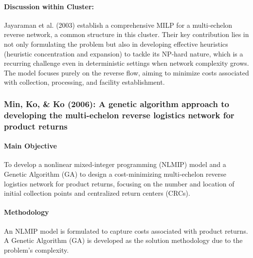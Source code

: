 \paragraph{Discussion within Cluster:} Jayaraman et al. (2003) establish a comprehensive MILP for a multi-echelon reverse network, a common structure in this cluster. Their key contribution lies in not only formulating the problem but also in developing effective heuristics (heuristic concentration and expansion) to tackle its NP-hard nature, which is a recurring challenge even in deterministic settings when network complexity grows. The model focuses purely on the reverse flow, aiming to minimize costs associated with collection, processing, and facility establishment.

\subsubsection{Min, Ko, \& Ko (2006): A genetic algorithm approach to developing the multi-echelon reverse logistics network for product returns}
\paragraph{Main Objective} To develop a nonlinear mixed-integer programming (NLMIP) model and a Genetic Algorithm (GA) to design a cost-minimizing multi-echelon reverse logistics network for product returns, focusing on the number and location of initial collection points and centralized return centers (CRCs).
\paragraph{Methodology} An NLMIP model is formulated to capture costs associated with product returns. A Genetic Algorithm (GA) is developed as the solution methodology due to the problem's complexity.
